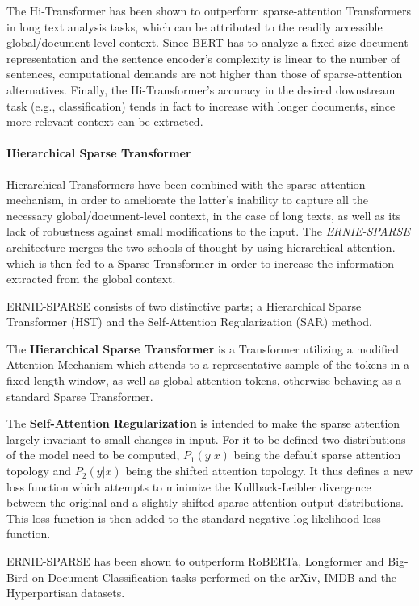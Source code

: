 \documentclass[preprint,review,12pt]{elsarticle}
\begin{document}
The Hi-Transformer has been shown to outperform sparse-attention Transformers in long text analysis tasks, which can be attributed to the readily accessible global/document-level context. Since BERT has to analyze a fixed-size document representation and the sentence encoder's complexity is linear to the number of sentences, computational demands are not higher than those of sparse-attention alternatives. Finally, the Hi-Transformer's accuracy in the desired downstream task (e.g., classification) tends in fact to increase with longer documents, since more relevant context can be extracted.


\paragraph{Hierarchical Sparse Transformer} Hierarchical Transformers have been combined with the sparse attention mechanism, in order to ameliorate the latter's inability to capture all the necessary global/document-level context, in the case of long texts, as well as its lack of robustness against small modifications to the input. The \textit{ERNIE-SPARSE} architecture \cite{liu} merges the two schools of thought by using hierarchical attention. which is then fed to a Sparse Transformer in order to increase the information extracted from the global context.

ERNIE-SPARSE consists of two distinctive parts; a Hierarchical Sparse Transformer (HST) and the Self-Attention Regularization (SAR) method.

The \textbf{Hierarchical Sparse Transformer} is a Transformer utilizing a modified Attention Mechanism which attends to a representative sample of the tokens in a fixed-length window, as well as global attention tokens, otherwise behaving as a standard Sparse Transformer. 

The \textbf{Self-Attention Regularization} is intended to make the sparse attention largely invariant to small changes in input. For it to be defined two distributions of the model need to be computed, $P_{1}(y|x)$ being the default sparse attention topology and $P_{2}(y|x)$ being the shifted attention topology. It thus defines a new loss function which attempts to minimize the Kullback-Leibler divergence between the original and a slightly shifted sparse attention output distributions. This loss function is then added to the standard negative log-likelihood loss function.

ERNIE-SPARSE has been shown to outperform RoBERTa, Longformer and Big-Bird on Document Classification tasks performed on the arXiv, IMDB and the Hyperpartisan datasets. 
\end{document}
